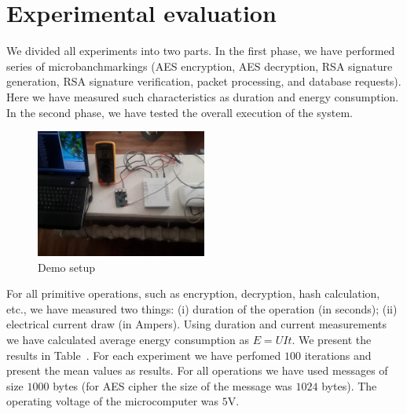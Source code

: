 \section{Experimental evaluation}
\label{section:experiments}

We divided all experiments into two parts. In the first phase,
we have performed series of microbanchmarkings (AES encryption, 
AES decryption, RSA signature generation, RSA signature verification, 
packet processing, and database requests). Here we have measured such 
characteristics as duration and energy consumption. 
In the second phase, we have tested the overall execution of 
the system. 

\begin{figure}[!h]
	\includegraphics[width=0.5\textwidth]{graphics/demo.jpg}
	\caption{Demo setup}
	\label{fig:demo}
\end{figure}

For all primitive operations, such as encryption, decryption, hash
calculation, etc., we have measured two things: (i) duration of the
operation (in seconds); (ii) electrical current draw (in Ampers). Using duration and 
current measurements we have calculated average energy consumption as $E=UIt$.
We present the results in Table~\cite{fig:measurements}. For each experiment
we have perfomed $100$ iterations and present the mean values as results. For all operations 
we have used messages of size $1000$ bytes (for AES cipher the size of the 
message was $1024$ bytes). The operating voltage of the 
microcomputer was $5$V.

